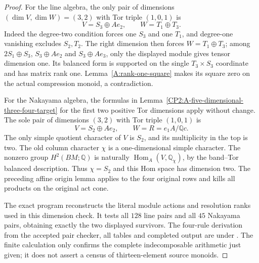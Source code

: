 \begin{proof}
For the line algebra, the only pair of dimensions
$(\dim V,\dim W)=(3,2)$ with Tor triple $(1,0,1)$ is
\[
 V=S_3\oplus Ae_2,\qquad W=T_1\oplus T_3.
\]
Indeed the degree-two condition forces one $S_3$ and one
$T_1$, and degree-one vanishing excludes $S_2,T_2$.
The right dimension then forces $W=T_1\oplus T_3$;
among $2S_1\oplus S_3$, $S_3\oplus Ae_2$ and
$S_3\oplus Ae_3$, only the displayed module gives
tensor dimension one. Its balanced form is supported
on the single $T_3\times S_3$ coordinate and has matrix
rank one. Lemma~\ref{A:rank-one-square} makes its square
zero on the actual compression monoid, a contradiction.

For the Nakayama algebra, the formulas in
Lemma~\ref{CP2:A-five-dimensional-three-four-target}
for the first two positive Tor dimensions apply without
change. The sole pair of dimensions $(3,2)$ with Tor
triple $(1,0,1)$ is
\[
 V=S_2\oplus Ae_2,\qquad W=R=e_1A/\mathbb Qc.
\]
The only simple quotient character of $V$ is $S_2$,
and its multiplicity in the top is two. The old column
character $\chi$ is a one-dimensional simple character.
The nonzero group $H^2(BM;\mathbb Q)$ is naturally
$\operatorname{Hom}_A(V,\mathbb Q_\chi)$, by the
band--Tor balanced description. Thus $\chi=S_2$ and
this Hom space has dimension two. The preceding affine
origin lemma applies to the four original rows and kills
all products on the original act cone.

The exact program
reconstructs the literal module actions and
resolution ranks used in this dimension check. It tests
all $128$ line pairs and all $45$ Nakayama pairs, obtaining
exactly the two displayed survivors. The four-rule
derivation from the accepted pair checker, all tables
and completed output are under
.
The finite calculation only confirms the complete
indecomposable arithmetic just given; it does not assert
a census of thirteen-element source monoids.
\end{proof}

